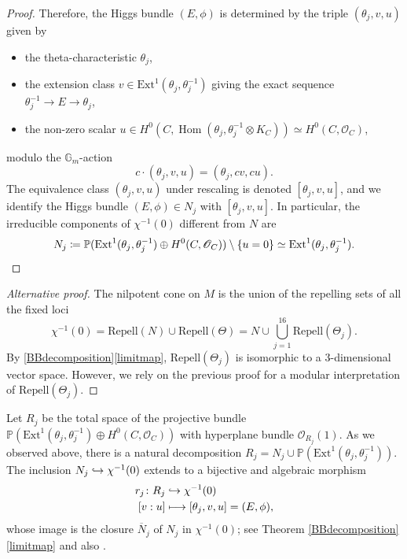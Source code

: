 \documentclass[11pt]{article}
\let\mathcal\mathscr
\newcommand\mto{\mathchoice{\longmapsto}{\mapsto}{\mapsto}{\mapsto}}
\newcommand\hto{\mathrel{\lhook\joinrel\to}}
\theoremstyle{definition}
\newcommand{\Gm}{\mathbb{G}_m}
\newcommand{\PP}{\mathbb{P}}
\newcommand{\Hom}{\operatorname{Hom}}
\let\NBun N
\let\Rcomp R
\begin{document}
\begin{proof}
Therefore, the Higgs bundle $(E, \phi)$ is determined by the triple $(\theta_j, v, u)$ given by
\begin{itemize}
\item the theta-characteristic $\theta_j$,
\item the extension class $v \in \mathrm{Ext}^1(\theta_j, \theta^{-1}_j)$ giving the exact sequence $\theta^{-1}_j \to E\to \theta_j$,
\item the non-zero scalar $u \in H^0(C, \Hom(\theta_j, \theta^{-1}_j \otimes K_C)) \simeq H^0(C, \mathcal{O}_C)$,
\end{itemize}
modulo the $\Gm$\nobreakdash-action
\[
c \cdot (\theta_j, v, u)=(\theta_j, cv, cu).
\]
The equivalence class $(\theta_j, v, u)$ under rescaling is denoted $[\theta_j, v, u]$, and we identify the Higgs bundle $(E, \phi) \in \NBun_j$ with $[\theta_j, v, u]$. In particular, the irreducible components of $\chi^{-1}(0)$ different from $N$ are
\[
\NBun_j \coloneqq \PP(\mathrm{Ext}^1(\theta_j, \theta^{-1}_j) \oplus H^0(C, \mathcal{O}_C))\setminus \{u=0\} \simeq \mathrm{Ext}^1(\theta_j, \theta^{-1}_j).\qedhere
\]
\end{proof}

\begin{proof}[Alternative proof]
The nilpotent cone on $M$ is the union of the repelling sets of all the fixed loci
\[
\chi^{-1}(0)= \mathrm{Repell}(\NBun) \cup \mathrm{Repell}(\Theta) = \NBun \cup \bigcup^{16}_{j=1}\mathrm{Repell}(\Theta_j).
\]
By \cref{BBdecomposition}\eqref{limitmap}, $\mathrm{Repell}(\Theta_j)$ is isomorphic to a $3$-dimensional vector space. However, we rely on the previous proof for a modular interpretation of $\mathrm{Repell}(\Theta_j)$.
\end{proof}
Let $\Rcomp_j$ be the total space of the projective bundle
$\PP(\mathrm{Ext}^1(\theta_j, \theta^{-1}_j) \oplus H^0(C, \mathcal{O}_C))$ with hyperplane bundle $\mathcal{O}_{\Rcomp_j}(1)$.
As we observed above, there is a natural decomposition
$
\Rcomp_j = \NBun_j \cup \PP(\mathrm{Ext}^1(\theta_j, \theta^{-1}_j)).
$
The inclusion $\NBun_j \hto \chi^{-1}(0)$ extends to a bijective and algebraic morphism
\begin{align*}
r_j \colon \Rcomp_j & \hto \chi^{-1}(0)\\
[v:u] & \mto [\theta_j, v, u]=(E, \phi),
\end{align*}
whose image is the closure $\overline{\NBun}_j$ of $\NBun_j$ in $\chi^{-1}(0)$; see Theorem \ref{BBdecomposition}\eqref{limitmap} and also \cite[Prop.\,24]{Thaddeus89}.
\end{document}
